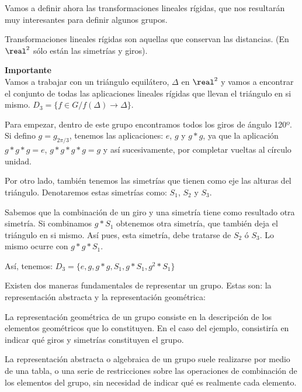 \documentclass[nochap]{apuntes}
\begin{document}
Vamos a definir ahora las transformaciones lineales rígidas, que nos resultarán muy interesantes para definir algunos grupos.

\begin{defn}
Transformaciones lineales rígidas son aquellas que conservan las distancias. (En $\real^{2}$  sólo están las simetrías y giros).
\end{defn}

\begin{example}\textbf{Importante}\\
  Vamos a trabajar con un triángulo equilátero, $\Delta$  en $\real^{2}$  y vamos a encontrar el conjunto de todas las aplicaciones lineales rígidas
  que llevan el triángulo en si mismo. $D_{3}=\{f\in G / f(\Delta)\longrightarrow\Delta\}$.

  Para empezar, dentro de este grupo encontramos todos los giros de ángulo 120º. \\
  Si defino $g=g_{2\pi/3}$, tenemos las aplicaciones: $e$, $g$  y $g\ast g$, ya que la aplicación $g\ast g\ast g=e$, $g\ast g\ast g\ast g=g$  y así sucesivamente, por completar vueltas al círculo unidad.

  Por otro lado, también tenemos las simetrías que tienen como eje las alturas del triángulo. Denotaremos estas simetrías como: $S_{1}$, $S_{2}$  y $S_{3}$.

  Sabemos que la combinación de un giro y una simetría tiene como resultado otra simetría. Si combinamos $g\ast S_{1}$  obtenemos otra simetría, que también deja el triángulo en si mismo. Así pues, esta simetría, debe tratarse de $S_{2}$  ó $S_{3}$. Lo mismo ocurre con $g\ast g\ast S_{1}$.

  Así, tenemos: $D_{3}=\{e, g, g\ast g, S_{1}, g\ast S_{1}, g^{2}\ast S_{1}\}$
\end{example}

Existen dos maneras fundamentales de representar un grupo. Estas son: la representación abstracta y la representación geométrica:

\begin{defn}
  La representación geométrica de un grupo consiste en la descripción de los elementos geométricos que lo constituyen.
  En el caso del ejemplo, consistiría en indicar qué giros y simetrías constituyen el grupo.
\end{defn}

\begin{defn}
  La representación abstracta o algebraica de un grupo suele realizarse por medio de una tabla, o una serie de restricciones sobre las operaciones
  de combinación de los elementos del grupo, sin necesidad de indicar qué es realmente cada elemento.
\end{defn}
\end{document}
